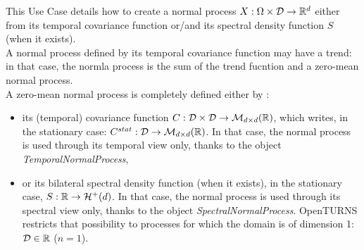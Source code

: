 \renewcommand{\filename}{docUC_StocProc_NormalProcess_Creation.tex}
\renewcommand{\filetitle}{UC : Creation of a normal process}

\HeaderIIILevel

\label{StationaryNormalProcessCreation}


This Use Case details how to create a  normal process $X: \Omega \times {\mathcal D} \rightarrow {\mathbb R}^d$ either from its temporal covariance function or/and its spectral density function $S$ (when it exists). \\

A normal process defined by its temporal covariance function may have a trend: in that case, the normla process is the sum of the trend fucntion and a zero-mean normal process.\\

A zero-mean normal process is completely defined either by :
\begin{itemize}
\item its (temporal) covariance function   $C :   {\mathcal D}\times {\mathcal D}  \rightarrow  \mathcal{M}_{d \times d}({\mathbb R})$, which writes, in the stationary case: $C^{stat}:  {\mathcal D} \rightarrow  \mathcal{M}_{d \times d}({\mathbb R})$.  In that case, the normal process is used through its temporal view only, thanks to the object {\itshape TemporalNormalProcess},
\item or its bilateral spectral density function (when it exists), in the stationary case,  $S : {\mathbb R} \rightarrow \mathcal{H}^+(d)$. In that case, the normal process is used through its spectral view only, thanks to the object {\itshape SpectralNormalProcess}. OpenTURNS restricts that possibility to processes for which the domain is of dimension 1: ${\mathcal D} \in {\mathbb R}$ ($n=1$).
\end{itemize}

